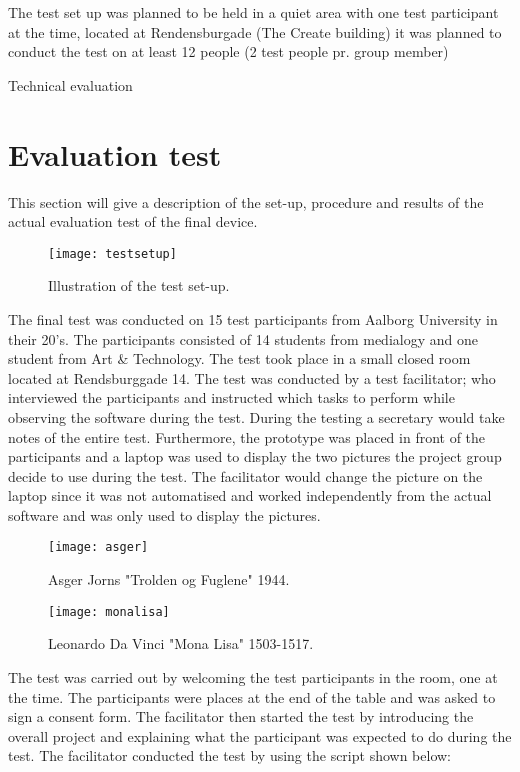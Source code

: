 The test set up was planned to be held in a quiet area with one test participant at the time, located at Rendensburgade (The Create building) it was planned to conduct the test on at least 12 people (2 test people pr. group member) 


Technical evaluation 



\section{Evaluation test}
This section will give a description of the set-up, procedure and results of the actual evaluation test of the final device. 

\begin{figure}[!h] 
\centering
\texttt{[image: testsetup]}
\caption{\label{fig:testsetup} Illustration of the test set-up.}
\end{figure}

The final test was conducted on 15 test participants from Aalborg University in their 20's. The participants consisted of 14 students from medialogy and one student from Art \& Technology.  The test took place in a small closed room located at Rendsburggade 14. The test was conducted by a test facilitator; who interviewed the participants and instructed which tasks to perform while observing the software during the test. During the testing a secretary would take notes of the entire test. Furthermore, the prototype was placed in front of the participants and a laptop was used to display the two pictures the project group decide to use during the test. The facilitator would change the picture on the laptop since it was not automatised and worked independently from the actual software and was only used to display the pictures.   

\begin{figure}[!h] 
\centering
\texttt{[image: asger]}
\caption{\label{fig:asger} Asger Jorns "Trolden og Fuglene" 1944.}
\end{figure}

\begin{figure}[!h] 
\centering
\texttt{[image: monalisa]}
\caption{\label{fig:monalisa} Leonardo Da Vinci "Mona Lisa" 1503-1517.}
\end{figure}

The test was carried out by welcoming the test participants in the room, one at the time. The participants were places at the end of the table and was asked to sign a consent form. The facilitator then started the test by introducing the overall project and explaining what the participant was expected to do during the test. The facilitator conducted the test by using the script shown below:


